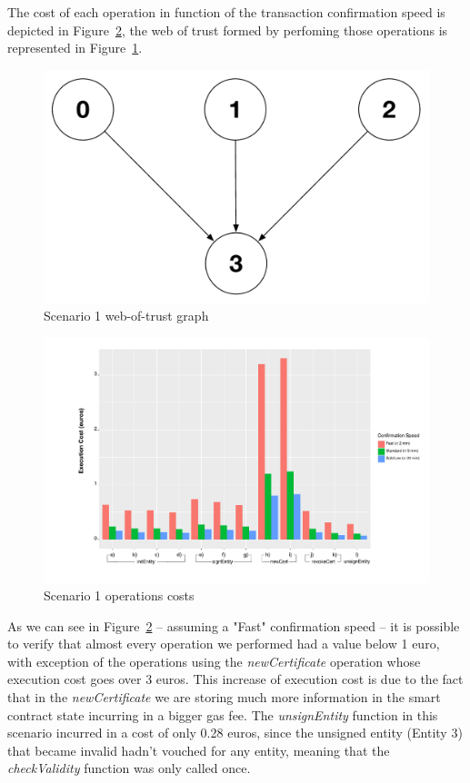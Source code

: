 The cost of each operation in function of the transaction confirmation speed is depicted in Figure~\ref{fig:scenario1-operation-cost}, the web of trust formed by perfoming those operations is represented in Figure~\ref{fig:scenario1-wot-graph}.

\begin{figure}[htb]
  \centering
  \includegraphics[scale=0.5]{Figures/evaluation/wot-scenario1-graph.pdf}
  \caption{Scenario 1 web-of-trust graph}
\label{fig:scenario1-wot-graph}
\end{figure}

\begin{figure}[htb]
  \centering
  \includegraphics[scale=0.5]{Figures/evaluation/wot-scenario1.pdf}
  \caption{Scenario 1 operations costs}
\label{fig:scenario1-operation-cost}
\end{figure}

As we can see in Figure~\ref{fig:scenario1-operation-cost} – assuming a "Fast" confirmation speed – it is possible to verify that almost every operation we performed had a value below 1 euro, with exception of the operations using the \textit{newCertificate} operation whose execution cost goes over 3 euros.
This increase of execution cost is due to the fact that in the \textit{newCertificate} we are storing much more information in the smart contract state incurring in a bigger gas fee.
The \textit{unsignEntity} function in this scenario incurred in a cost of only 0.28 euros, since the unsigned entity (Entity 3) that became invalid hadn't vouched for any entity, meaning that the \textit{checkValidity} function was only called once.

